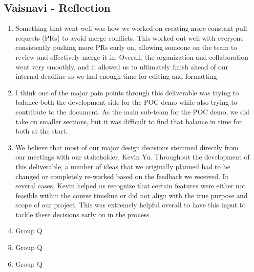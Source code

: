 \documentclass[12pt, titlepage]{article}
\begin{document}
\subsection*{Vaisnavi - Reflection}
\begin{enumerate}
  \item Something that went well was how we worked on creating more constant pull requests (PRs) to avoid merge conflicts. This worked out well with everyone consistently pushing more PRs early on, allowing someone on the team to review and effectively merge it in. Overall, the organization and collaboration went very smoothly, and it allowed us to ultimately finish ahead of our internal deadline so we had enough time for editing and formatting.
  \item I think one of the major pain points through this deliverable was trying to balance both the development side for the POC demo while also trying to contribute to the document. As the main sub-team for the POC demo, we did take on smaller sections, but it was difficult to find that balance in time for both at the start. 
  \item We believe that most of our major design decisions stemmed directly from our meetings with our stakeholder, Kevin Yu. Throughout the development of this deliverable, a number of ideas that we originally planned had to be changed or completely re-worked based on the feedback we received. In several cases, Kevin helped us recognize that certain features were either not feasible within the course timeline or did not align with the true purpose and scope of our project. This was extremely helpful overall to have this input to tackle these decisions early on in the process.
  \item Group Q
  \item Group Q
  \item Group Q
  

\end{enumerate}
\end{document}

